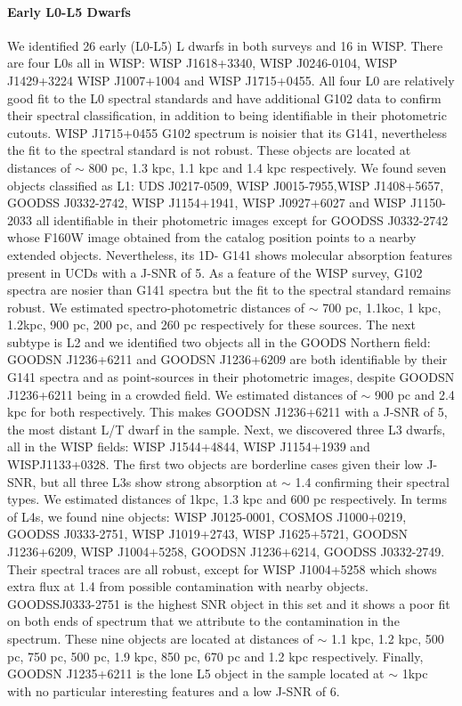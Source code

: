 \documentclass[manuscript]{aastex63}
\begin{document}
\paragraph{Early L0-L5 Dwarfs}
We identified 26 early (L0-L5) L dwarfs in both surveys and 16 in WISP. There are four L0s all in WISP: WISP J1618+3340, WISP J0246-0104, WISP J1429+3224 WISP J1007+1004 and WISP J1715+0455. All four L0 are relatively good fit to the L0 spectral standards and have additional G102 data to confirm their spectral classification, in addition to being identifiable in their photometric cutouts. WISP J1715+0455 G102 spectrum is noisier that its G141, nevertheless the fit to the spectral standard is not robust. These objects are located at distances of $\sim$ 800 pc, 1.3 kpc, 1.1 kpc and 1.4 kpc respectively. We found seven objects classified as L1: UDS J0217-0509, WISP J0015-7955,WISP J1408+5657, GOODSS J0332-2742, WISP J1154+1941, WISP J0927+6027 and WISP J1150-2033 all identifiable in their photometric images except for GOODSS J0332-2742 whose F160W image obtained from the catalog position points to a nearby extended objects. Nevertheless, its 1D- G141 shows molecular absorption features present in UCDs with a J-SNR of 5. As a feature of the WISP survey, G102 spectra are nosier than G141 spectra but the fit to the spectral standard remains robust. We estimated spectro-photometric distances of $\sim$ 700 pc, 1.1koc, 1 kpc, 1.2kpc, 900 pc, 200 pc, and 260 pc respectively for these sources. The next subtype is L2 and we identified two objects all in the GOODS Northern field: GOODSN J1236+6211 and GOODSN J1236+6209 are both identifiable by their G141 spectra and as point-sources in their photometric images, despite GOODSN J1236+6211 being in a crowded field. We estimated distances of $\sim$ 900 pc and 2.4 kpc for both respectively. This makes GOODSN J1236+6211 with a J-SNR of 5, the most distant L/T dwarf in the sample. Next, we discovered three L3 dwarfs, all in the WISP fields: WISP J1544+4844, WISP J1154+1939 and WISPJ1133+0328. The first two objects are borderline cases given their low J-SNR, but all three L3s show strong \wat absorption at $\sim$ 1.4 \micron confirming their spectral types. We estimated distances of 1kpc, 1.3 kpc and 600 pc respectively. In terms of L4s, we found nine objects: WISP J0125-0001, COSMOS J1000+0219, GOODSS J0333-2751, WISP J1019+2743, WISP J1625+5721, GOODSN J1236+6209, WISP J1004+5258, GOODSN J1236+6214, GOODSS J0332-2749. Their spectral traces are all robust, except for WISP J1004+5258 which shows extra flux at 1.4 \micron from possible contamination with nearby objects. GOODSSJ0333-2751 is the highest SNR object in this set and it shows a poor fit on both ends of spectrum that we attribute to the contamination in the spectrum. These nine objects are located at distances of $\sim$ 1.1 kpc, 1.2 kpc, 500 pc, 750 pc, 500 pc, 1.9 kpc, 850 pc, 670 pc and 1.2 kpc respectively. Finally, GOODSN J1235+6211 is the lone L5 object in the sample located at $\sim$ 1kpc with no particular interesting features and a low J-SNR of 6.
\end{document}
